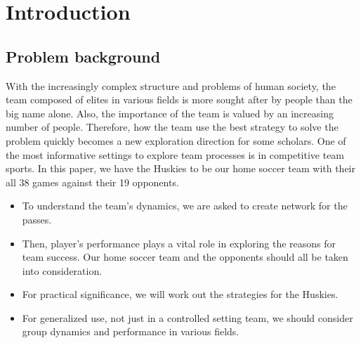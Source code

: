 \documentclass{mcmthesis}
\begin{document}
\section{Introduction}
\subsection{Problem background}
With the increasingly complex structure and problems of human society, the team composed of elites in various fields is more sought after by people than the big name alone. Also, the importance of the team is valued by an increasing number of people. Therefore, how the team use the best strategy to solve the problem quickly becomes a new exploration direction for some scholars.
One of the most informative settings to explore team processes is in competitive team sports. In this paper, we have the Huskies to be our home soccer team with their all 38 games against their 19 opponents. 
\begin{itemize}
\item To understand the team’s dynamics, we are asked to create network for the passes.
\item Then, player’s performance plays a vital role in exploring the reasons for team success. Our home soccer team and the opponents should all be taken into consideration.
\item For practical significance, we will work out the strategies for the Huskies.
\item For generalized use, not just in a controlled setting team, we should consider group dynamics and performance in various fields.
\end{itemize}
\end{document}

